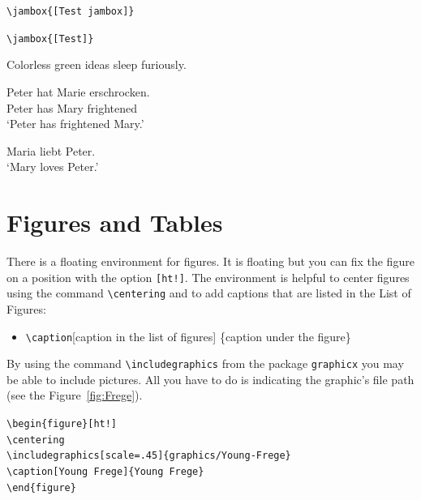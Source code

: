 \smallskip

\verb||	\jambox{[Test jambox]}

\verb|\jambox{[Test]}|	\jambox{[Test]}

\medskip

\settowidth{}
\ea Colorless green ideas sleep furiously. 

\ex 
\gll Peter hat Marie erschrocken. \\
Peter has Mary frightened\\ 
\glt `Peter has frightened Mary.' 

\ex
\gll Maria liebt Peter.\\
`Mary loves Peter.'\\ 
\z


\section{Figures and Tables}
\label{ch:FigTab}


There is a floating environment for figures. It is floating but you can fix the figure on a position with the option \texttt{[ht!]}. The environment is helpful to center figures using the command \texttt{\textbackslash centering} and to add captions that are listed in the List of Figures:

\begin{itemize}
	\item[] \texttt{\textbackslash caption}[caption in the list of figures] \{caption under the figure\}
\end{itemize}

By using the command \texttt{\textbackslash includegraphics} from the package \texttt{graphicx} you may be able to include pictures. All you have to do is indicating the graphic's file path (see the Figure~\ref{fig:Frege}).

\bigskip

{	\footnotesize
\noindent \texttt{\textbackslash begin\{figure\}[ht!]\\
	\textbackslash centering\\
	\textbackslash includegraphics[scale=.45]\{graphics/Young-Frege\} \\
	\textbackslash caption[Young Frege]\{Young Frege\} \\
	\textbackslash end\{figure\} }
}

